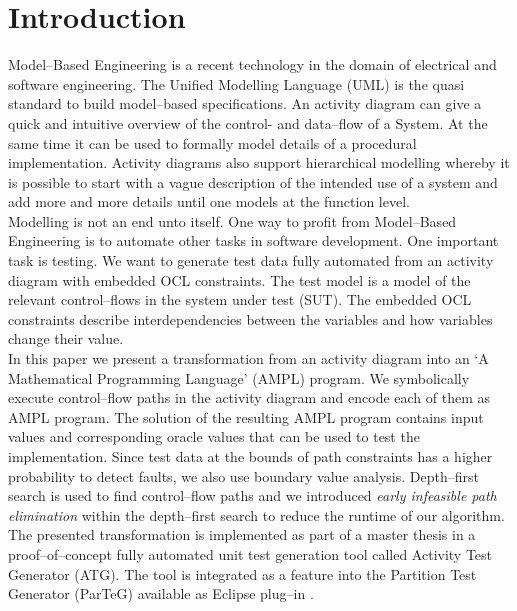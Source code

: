 \documentclass[runningheads,a4paper]{llncs}%
\begin{document}
\section{Introduction}%
Model--Based Engineering is a recent technology in the domain of electrical and software engineering. The Unified Modelling Language\textsuperscript{\texttrademark} (UML) is the quasi standard to build model--based specifications. 
An activity diagram can give a quick and intuitive overview of the control- and data--flow of a System. At the same time it can be used to formally model details of a procedural implementation. Activity diagrams also support hierarchical modelling whereby it is possible to start with a vague description of the intended use of a system and add more and more details until one models at the function level.\\
Modelling is not an end unto itself. One way to profit from Model--Based Engineering is to automate other tasks in software development. One important task is testing. We want to generate test data fully automated from an activity diagram with embedded OCL constraints. The test model is a model of the relevant control--flows in the system under test (SUT). The embedded OCL constraints describe interdependencies between the variables and how variables change their value.\\
In this paper we present a transformation from an activity diagram into an `A Mathematical Programming Language' (AMPL) program. We symbolically execute control--flow paths in the activity diagram and encode each of them as AMPL program. The solution of the resulting AMPL program contains input values and corresponding oracle values that can be used to test the implementation. Since test data at the bounds of path constraints has a higher probability to detect faults, we also use boundary value analysis. Depth--first search is used to find control--flow paths and we introduced \emph{early infeasible path elimination} within the depth--first search to reduce the runtime of our algorithm. The presented transformation is implemented as part of a master thesis \cite{Kurth2014AutomatedGen} in a proof--of--concept fully automated unit test generation tool called Activity Test Generator (ATG). The tool is integrated as a feature into the Partition Test Generator (ParTeG) available as Eclipse plug--in \cite{PartegWebsite}.\\%
\end{document}
